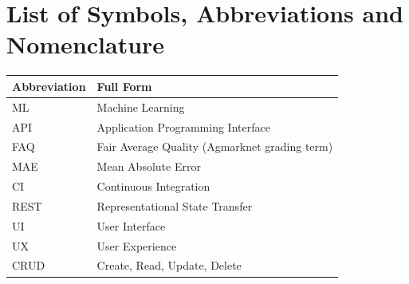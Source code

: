 \chapter*{List of Symbols, Abbreviations and Nomenclature}

\begin{longtable}{@{}p{3.5cm}p{10cm}@{}}
\toprule
\textbf{Abbreviation} & \textbf{Full Form} \\
\midrule
\endhead
ML & Machine Learning \\
API & Application Programming Interface \\
FAQ & Fair Average Quality (Agmarknet grading term) \\
MAE & Mean Absolute Error \\
CI & Continuous Integration \\
REST & Representational State Transfer \\
UI & User Interface \\
UX & User Experience \\
CRUD & Create, Read, Update, Delete \\
\bottomrule
\end{longtable}

